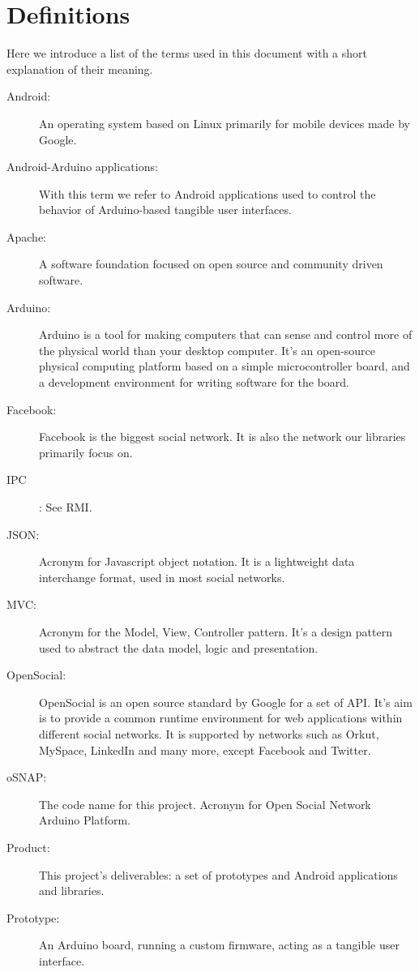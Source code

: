 \section{Definitions}

Here we introduce a list of the terms used in this document with a short explanation of their meaning.

\begin{description}

\item[Android:]
	An operating system based on Linux primarily for mobile devices made by Google.
\item[Android-Arduino applications:]
	With this term we refer to Android applications used to control the behavior of Arduino-based tangible user interfaces.
\item[Apache:]
	A software foundation focused on open source and community driven software.
\item[Arduino:]
	Arduino is a tool for making computers that can sense and control more of the physical world than your
	desktop computer. It's an open-source physical computing platform based on a simple microcontroller board, and a development
	environment for writing software for the board. 
\item[Facebook:]
	Facebook is the biggest social network. It is also the network our libraries primarily focus on.
\item[IPC]:
	See RMI.
\item[JSON:]
	Acronym for Javascript object notation. It is a lightweight data interchange format,
	used in most social networks.
\item[MVC:]
	Acronym for the Model, View, Controller pattern. It's a design pattern used to abstract the data model, logic and presentation.
\item[OpenSocial:]
	OpenSocial is an open source standard by Google for a set of API. It's aim is to
	provide a common runtime environment for web applications within different social networks. It is supported by networks
	such as Orkut, MySpace, LinkedIn and many more, except Facebook and Twitter.
\item[oSNAP:]
	The code name for this project. Acronym for Open Social Network Arduino Platform.
\item[Product:]
	This project's deliverables: a set of prototypes and Android applications and libraries.
\item[Prototype:]
	An Arduino board, running a custom firmware, acting as a tangible user interface.

\end{description}
